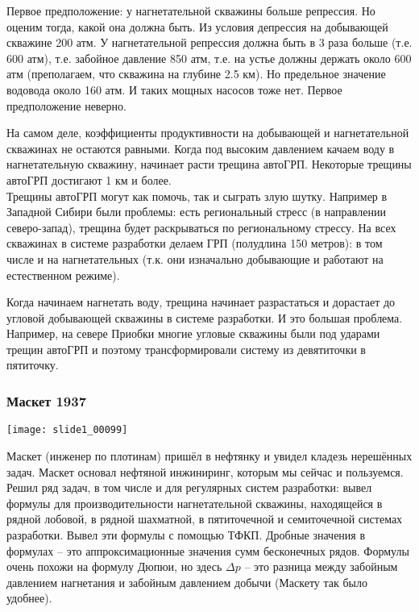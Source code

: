 \documentclass[main.tex]{subfiles}
\begin{document}
Первое предположение: у нагнетательной скважины больше репрессия. Но оценим тогда, какой она должна быть. Из условия депрессия на добывающей скважине 200 атм. У нагнетательной репрессия должна быть в 3 раза больше (т.е. 600 атм), т.е. забойное давление 850 атм, т.е. на устье должны держать около 600 атм (преполагаем, что скважина на глубине 2.5 км).
Но предельное значение водовода около 160 атм. И таких мощных насосов тоже нет. Первое предположение неверно.

На самом деле, коэффициенты продуктивности на добывающей и нагнетательной скважинах не остаются равными. Когда под высоким давлением качаем воду в нагнетательную скважину, начинает расти трещина автоГРП. Некоторые трещины автоГРП достигают 1 км и более.\\

Трещины автоГРП могут как помочь, так и сыграть злую шутку.
Например в Западной Сибири были проблемы: есть региональный стресс (в направлении северо-запад), трещина будет раскрываться по региональному стрессу. На всех скважинах в системе разработки делаем ГРП (полудлина 150 метров): в том числе и на нагнетательных (т.к. они изначально добывающие и работают на естественном режиме).

Когда начинаем нагнетать воду, трещина начинает разрастаться и дорастает до угловой добывающей скважины в системе разработки. И это большая проблема. Например, на севере Приобки многие угловые скважины были под ударами трещин автоГРП и поэтому трансформировали систему из девятиточки в пятиточку.

\subsubsection{Маскет 1937}

\texttt{[image: slide1\_00099]}

Маскет (инженер по плотинам) пришёл в нефтянку и увидел кладезь нерешённых задач. Маскет основал нефтяной инжиниринг, которым мы сейчас и пользуемся.\\

Решил ряд задач, в том числе и для регулярных систем разработки: вывел формулы для производительности нагнетательной скважины, находящейся в рядной лобовой, в рядной шахматной, в пятиточечной и семиточечной системах разработки. Вывел эти формулы с помощью ТФКП. Дробные значения в формулах -- это аппроксимационные значения сумм бесконечных рядов. Формулы очень похожи на формулу Дюпюи, но здесь $\Delta p$ -- это разница между забойным давлением нагнетания и забойным давлением добычи (Маскету так было удобнее).
\end{document}
